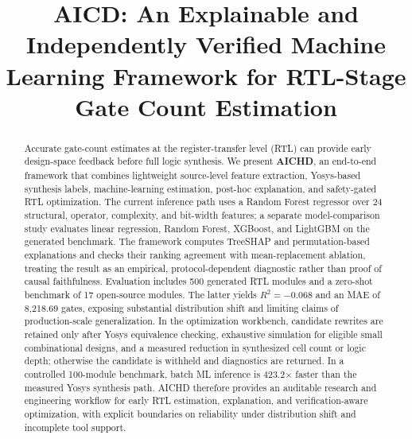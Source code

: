 \documentclass[conference]{IEEEtran}
\begin{document}
\title{AICD: An Explainable and Independently Verified Machine Learning Framework for RTL-Stage Gate Count Estimation}

\author{
}

\maketitle

\begin{abstract}
Accurate gate-count estimates at the register-transfer level (RTL) can provide
early design-space feedback before full logic synthesis. We present
\textbf{AICHD}, an end-to-end framework that combines lightweight source-level
feature extraction, Yosys-based synthesis labels, machine-learning estimation,
post-hoc explanation, and safety-gated RTL optimization. The current inference
path uses a Random Forest regressor over 24 structural, operator, complexity,
and bit-width features; a separate model-comparison study evaluates linear
regression, Random Forest, XGBoost, and LightGBM on the generated benchmark.
The framework computes TreeSHAP and permutation-based explanations and checks
their ranking agreement with mean-replacement ablation, treating the result as
an empirical, protocol-dependent diagnostic rather than proof of causal
faithfulness. Evaluation includes 500 generated RTL modules and a zero-shot
benchmark of 17 open-source modules. The latter yields $R^2=-0.068$ and an MAE
of 8,218.69 gates, exposing substantial distribution shift and limiting claims
of production-scale generalization. In the optimization workbench, candidate
rewrites are retained only after Yosys equivalence checking, exhaustive
simulation for eligible small combinational designs, and a measured reduction
in synthesized cell count or logic depth; otherwise the candidate is withheld
and diagnostics are returned. In a controlled 100-module benchmark, batch ML
inference is 423.2$\times$ faster than the measured Yosys synthesis path. AICHD
therefore provides an auditable research and engineering workflow for early RTL
estimation, explanation, and verification-aware optimization, with explicit
boundaries on reliability under distribution shift and incomplete tool support.
\end{abstract}
\end{document}
